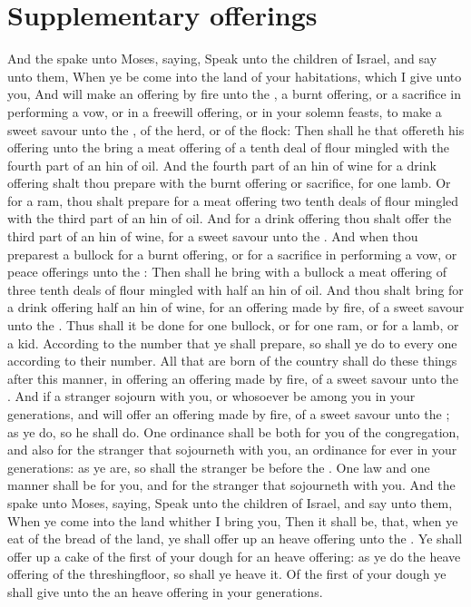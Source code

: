 \section*{Supplementary offerings}
\begin{biblechapter} %
\verse And the \LORD spake unto Moses, saying,
\verse Speak unto the children of Israel, and say unto them, When ye be come into the land of your habitations, which I give unto you,
\verse And will make an offering by fire unto the \LORD, a burnt offering, or a sacrifice in performing a vow, or in a freewill offering, or in your solemn feasts, to make a sweet savour unto the \LORD, of the herd, or of the flock:
\verse Then shall he that offereth his offering unto the \LORD bring a meat offering of a tenth deal of flour mingled with the fourth part of an hin of oil.
\verse And the fourth part of an hin of wine for a drink offering shalt thou prepare with the burnt offering or sacrifice, for one lamb.
\verse Or for a ram, thou shalt prepare for a meat offering two tenth deals of flour mingled with the third part of an hin of oil.
\verse And for a drink offering thou shalt offer the third part of an hin of wine, for a sweet savour unto the \LORD.
\verse And when thou preparest a bullock for a burnt offering, or for a sacrifice in performing a vow, or peace offerings unto the \LORD:
\verse Then shall he bring with a bullock a meat offering of three tenth deals of flour mingled with half an hin of oil.
\verse And thou shalt bring for a drink offering half an hin of wine, for an offering made by fire, of a sweet savour unto the \LORD.
\verse Thus shall it be done for one bullock, or for one ram, or for a lamb, or a kid.
\verse According to the number that ye shall prepare, so shall ye do to every one according to their number.
\verse All that are born of the country shall do these things after this manner, in offering an offering made by fire, of a sweet savour unto the \LORD.
\verse And if a stranger sojourn with you, or whosoever be among you in your generations, and will offer an offering made by fire, of a sweet savour unto the \LORD; as ye do, so he shall do.
\verse One ordinance shall be both for you of the congregation, and also for the stranger that sojourneth with you, an ordinance for ever in your generations: as ye are, so shall the stranger be before the \LORD.
\verse One law and one manner shall be for you, and for the stranger that sojourneth with you.
\verse And the \LORD spake unto Moses, saying,
\verse Speak unto the children of Israel, and say unto them, When ye come into the land whither I bring you,
\verse Then it shall be, that, when ye eat of the bread of the land, ye shall offer up an heave offering unto the \LORD.
\verse Ye shall offer up a cake of the first of your dough for an heave offering: as ye do the heave offering of the threshingfloor, so shall ye heave it.
\verse Of the first of your dough ye shall give unto the \LORD an heave offering in your generations.

\end{biblechapter}
